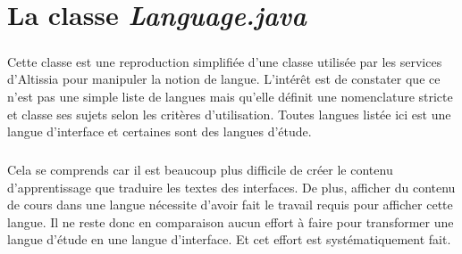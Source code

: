 \chapter{La classe \textit{Language.java}}
\label{ch:language-java}

\paragraph{}
Cette classe est une reproduction simplifiée d'une classe utilisée par les services d'Altissia pour manipuler la notion de langue.
L'intérêt est de constater que ce n'est pas une simple liste de langues mais qu'elle définit une nomenclature stricte et classe ses sujets selon les critères d'utilisation.
Toutes langues listée ici est une langue d'interface et certaines sont des langues d'étude.

\paragraph{}
Cela se comprends car il est beaucoup plus difficile de créer le contenu d'apprentissage que traduire les textes des interfaces.
De plus, afficher du contenu de cours dans une langue nécessite d'avoir fait le travail requis pour afficher cette langue.
Il ne reste donc en comparaison aucun effort à faire pour transformer une langue d'étude en une langue d'interface.
Et cet effort est systématiquement fait.

